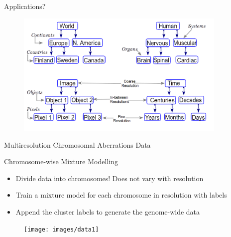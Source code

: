 \documentclass[utf8, a4paper]{beamer}
\begin{document}

\begin{frame}
  {Applications?}
  
  \vspace{-0.5cm}
  \begin{figure}
\centering
  \includegraphics[trim={0cm 0cm 0cm 0cm},clip, width=0.9\textwidth]{images/nonco}
\end{figure}
  
\end{frame}



\begin{frame}
  {Multiresolution Chromosomal Aberrations Data}

  \begin{alertblock}
    {Chromosome-wise Mixture Modelling}

    \begin{itemize}
    \itemsep -0.5em 
    \item Divide data into chromosomes! Does not vary with resolution
    \item Train a mixture model for each chromosome in resolution with labels
    \item Append the cluster labels to generate the genome-wide data
    \end{itemize}
  \end{alertblock}
  
  \vspace{-0.1cm}

\begin{figure}
\centering
  \texttt{[image: images/data1]}
\end{figure}
  
\end{frame}
\end{document}
